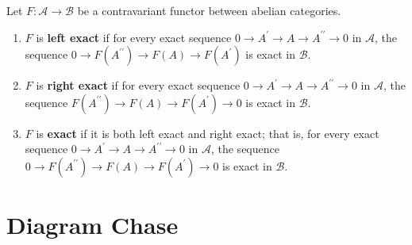 \documentclass[12pt, oneside]{book}
\begin{document}
\begin{definition}
    Let $F:\mathcal{A} \rightarrow \mathcal{B}$ be a contravariant functor between abelian categories.
    \begin{enumerate}
        \item
              $F$ is \textbf{left exact} if for every exact sequence $0 \rightarrow A^{\prime} \rightarrow A \rightarrow A^{\prime \prime} \rightarrow 0$ in $\mathcal{A}$, the sequence $0 \rightarrow F\left(A^{\prime \prime}\right) \rightarrow F(A) \rightarrow F\left(A^{\prime}\right) $ is exact in $\mathcal{B}$.
        \item
              $F$ is \textbf{right exact} if for every exact sequence $0\rightarrow A^{\prime} \rightarrow A \rightarrow A^{\prime \prime} \rightarrow 0$ in $\mathcal{A}$, the sequence $ F\left(A^{\prime \prime}\right) \rightarrow F(A) \rightarrow F\left(A^{\prime}\right)\rightarrow 0$ is exact in $\mathcal{B}$.
        \item
              $F$ is \textbf{exact} if it is both left exact and right exact; that is, for every exact sequence $0 \rightarrow A^{\prime} \rightarrow A \rightarrow A^{\prime \prime} \rightarrow 0$ in $\mathcal{A}$, the sequence $0 \rightarrow F\left(A^{\prime \prime}\right) \rightarrow F(A) \rightarrow F\left(A^{\prime}\right) \rightarrow 0$ is exact in $\mathcal{B}$.
    \end{enumerate}
\end{definition}


\section{Diagram Chase}
\end{document}
